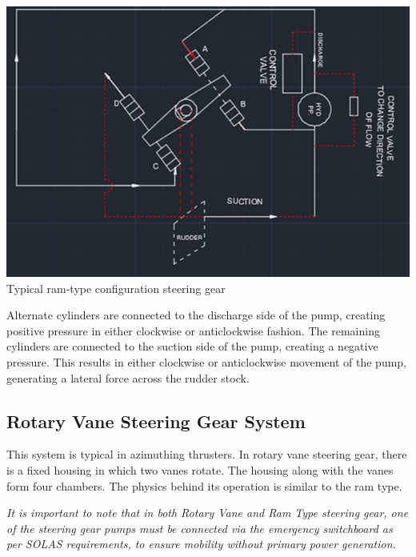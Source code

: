 \documentclass[11pt,a4paper]{article}
\begin{document}
\begin{center}
\includegraphics[width=\textwidth]{ramtype.png}
Typical ram-type configuration steering gear
\end{center}

Alternate cylinders are connected to the discharge side of the pump, creating positive pressure in either clockwise or anticlockwise fashion. The remaining cylinders are connected to the suction side of the pump, creating a negative pressure. This results in either clockwise or anticlockwise movement of the pump, generating a lateral force across the rudder stock.\cite{m5}

\subsection{Rotary Vane Steering Gear System}
This system is typical in azimuthing thrusters. In rotary vane steering gear, there is a fixed housing in which two vanes rotate. The housing along with the vanes form four chambers. The physics behind its operation is similar to the ram type.

\textit{It is important to note that in both Rotary Vane and Ram Type steering gear, one of the steering gear pumps must be connected via the emergency switchboard as per SOLAS requirements, to ensure mobility without primary power generation.}
\end{document}
